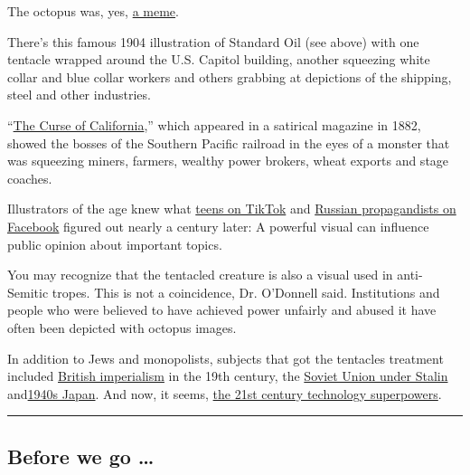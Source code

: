 The octopus was, yes,
\href{https://en.wikipedia.org/wiki/Internet_meme}{a meme}.

There's this famous 1904 illustration of Standard Oil (see above) with
one tentacle wrapped around the U.S. Capitol building, another squeezing
white collar and blue collar workers and others grabbing at depictions
of the shipping, steel and other industries.

``\href{http://nationalhumanitiescenter.org/pds/gilded/power/text1/octopusimages.pdf}{The
Curse of California},'' which appeared in a satirical magazine in 1882,
showed the bosses of the Southern Pacific railroad in the eyes of a
monster that was squeezing miners, farmers, wealthy power brokers, wheat
exports and stage coaches.

Illustrators of the age knew what
\href{https://www.nytimes3xbfgragh.onion/2020/05/07/style/memers-are-taking-over-tiktok.html}{teens
on TikTok} and
\href{https://www.nytimes3xbfgragh.onion/2017/11/01/us/politics/russia-2016-election-facebook.html}{Russian
propagandists on Facebook} figured out nearly a century later: A
powerful visual can influence public opinion about important topics.

You may recognize that the tentacled creature is also a visual used in
anti-Semitic tropes. This is not a coincidence, Dr. O'Donnell said.
Institutions and people who were believed to have achieved power
unfairly and abused it have often been depicted with octopus images.

In addition to Jews and monopolists, subjects that got the tentacles
treatment included
\href{https://fineartamerica.com/featured/imperialism-cartoon-1882-granger.html}{British
imperialism} in the 19th century, the
\href{https://www.popsci.com/article/technology/brief-history-octopi-taking-over-world/}{Soviet
Union under Stalin}
and\href{https://digital.library.cornell.edu/catalog/ss:3293931}{1940s
Japan}. And now, it seems,
\href{https://www.esquire.com/news-politics/a15895746/bust-big-tech-silicon-valley}{the
21st century technology superpowers}.

\begin{center}\rule{0.5\linewidth}{\linethickness}\end{center}

\hypertarget{before-we-go-}{%
\subsection{Before we go \ldots{}}\label{before-we-go-}}

